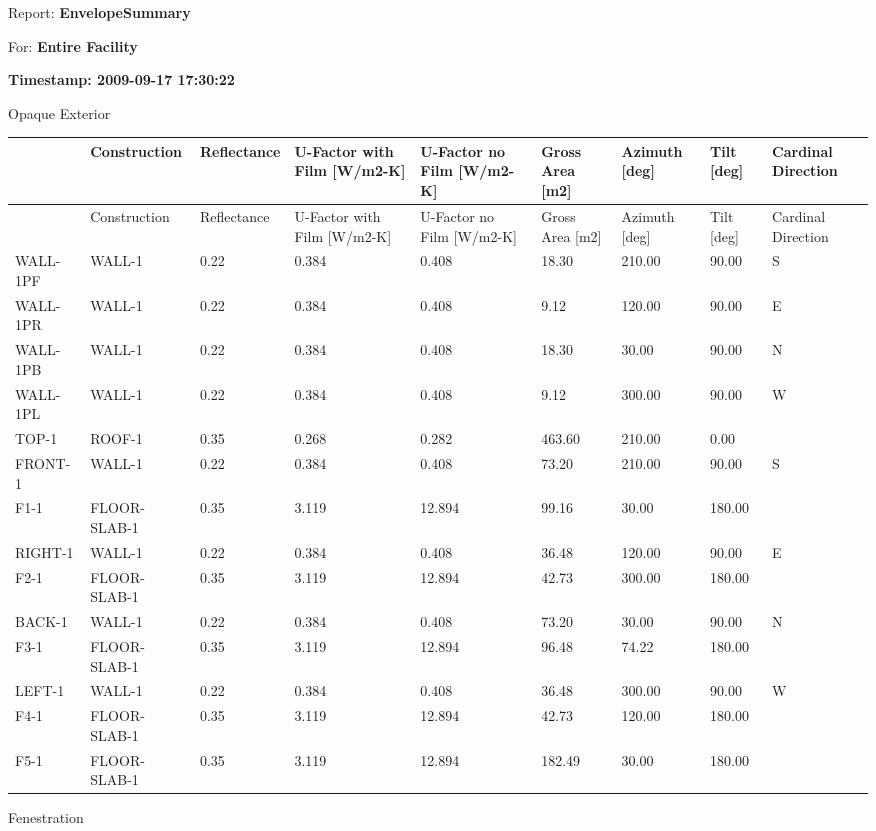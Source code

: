 Report: \textbf{EnvelopeSummary}

For: \textbf{Entire Facility}

\textbf{Timestamp: 2009-09-17 17:30:22}

Opaque Exterior

{\scriptsize
\begin{longtable}[c]{p{0.66in}p{0.66in}p{0.6in}p{0.6in}p{0.6in}p{0.6in}p{0.6in}p{0.6in}p{0.6in}}
\toprule
~ & Construction & Reflectance & U-Factor with Film [W/m2-K] & U-Factor no Film [W/m2-K] & Gross Area [m2] & Azimuth [deg] & Tilt [deg] & Cardinal Direction \tabularnewline
\midrule
\endfirsthead

\toprule
~ & Construction & Reflectance & U-Factor with Film [W/m2-K] & U-Factor no Film [W/m2-K] & Gross Area [m2] & Azimuth [deg] & Tilt [deg] & Cardinal Direction \tabularnewline
\midrule
\endhead

WALL-1PF & WALL-1 & 0.22 & 0.384 & 0.408 & 18.30 & 210.00 & 90.00 & S \tabularnewline
WALL-1PR & WALL-1 & 0.22 & 0.384 & 0.408 & 9.12 & 120.00 & 90.00 & E \tabularnewline
WALL-1PB & WALL-1 & 0.22 & 0.384 & 0.408 & 18.30 & 30.00 & 90.00 & N \tabularnewline
WALL-1PL & WALL-1 & 0.22 & 0.384 & 0.408 & 9.12 & 300.00 & 90.00 & W \tabularnewline
TOP-1 & ROOF-1 & 0.35 & 0.268 & 0.282 & 463.60 & 210.00 & 0.00 & ~ \tabularnewline
FRONT-1 & WALL-1 & 0.22 & 0.384 & 0.408 & 73.20 & 210.00 & 90.00 & S \tabularnewline
F1-1 & FLOOR-SLAB-1 & 0.35 & 3.119 & 12.894 & 99.16 & 30.00 & 180.00 & ~ \tabularnewline
RIGHT-1 & WALL-1 & 0.22 & 0.384 & 0.408 & 36.48 & 120.00 & 90.00 & E \tabularnewline
F2-1 & FLOOR-SLAB-1 & 0.35 & 3.119 & 12.894 & 42.73 & 300.00 & 180.00 & ~ \tabularnewline
BACK-1 & WALL-1 & 0.22 & 0.384 & 0.408 & 73.20 & 30.00 & 90.00 & N \tabularnewline
F3-1 & FLOOR-SLAB-1 & 0.35 & 3.119 & 12.894 & 96.48 & 74.22 & 180.00 & ~ \tabularnewline
LEFT-1 & WALL-1 & 0.22 & 0.384 & 0.408 & 36.48 & 300.00 & 90.00 & W \tabularnewline
F4-1 & FLOOR-SLAB-1 & 0.35 & 3.119 & 12.894 & 42.73 & 120.00 & 180.00 & ~ \tabularnewline
F5-1 & FLOOR-SLAB-1 & 0.35 & 3.119 & 12.894 & 182.49 & 30.00 & 180.00 & ~ \tabularnewline
\bottomrule
\end{longtable}}

Fenestration

